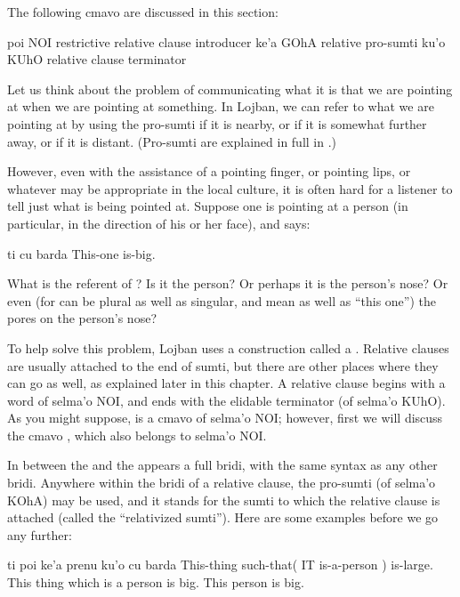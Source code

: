 The following cmavo are discussed in this section:

   poi NOI restrictive relative clause introducer
    ke'a    GOhA    relative pro-sumti
    ku'o    KUhO    relative clause terminator

Let us think about the problem of communicating what it is that
    we are pointing at when we are pointing at something. In
    Lojban, we can refer to what we are pointing at by using the
    pro-sumti  if it is nearby, or  if it is somewhat
    further away, or  if it is distant. (Pro-sumti are
    explained in full in .) 

However, even with the assistance of a pointing finger, or
    pointing lips, or whatever may be appropriate in the local
    culture, it is often hard for a listener to tell just what is
    being pointed at. Suppose one is pointing at a person (in
    particular, in the direction of his or her face), and says:
\begin{example}
ti cu barda\n
This-one is-big.
\end{example}

What is the referent of ? Is it the person? Or perhaps
    it is the person's nose? Or even (for  can be plural as
    well as singular, and mean  as well as ``this
    one'') the pores on the person's nose?

To help solve this problem, Lojban uses a construction
    called a . Relative clauses are usually
    attached to the end of sumti, but there are other places where
    they can go as well, as explained later in this chapter. A
    relative clause begins with a word of selma'o NOI, and ends
    with the elidable terminator  (of selma'o KUhO). As you
    might suppose,  is a cmavo of selma'o NOI; however,
    first we will discuss the cmavo , which also belongs to
    selma'o NOI.

In between the  and the  appears a full
    bridi, with the same syntax as any other bridi. Anywhere within
    the bridi of a relative clause, the pro-sumti  (of
    selma'o KOhA) may be used, and it stands for the sumti to which
    the relative clause is attached (called the ``relativized
    sumti''). Here are some examples before we go any further:
\begin{example}
ti poi ke'a prenu ku'o cu barda\n
This-thing such-that( IT is-a-person ) is-large.\n
This thing which is a person is big.\n
This person is big.
\end{example}

